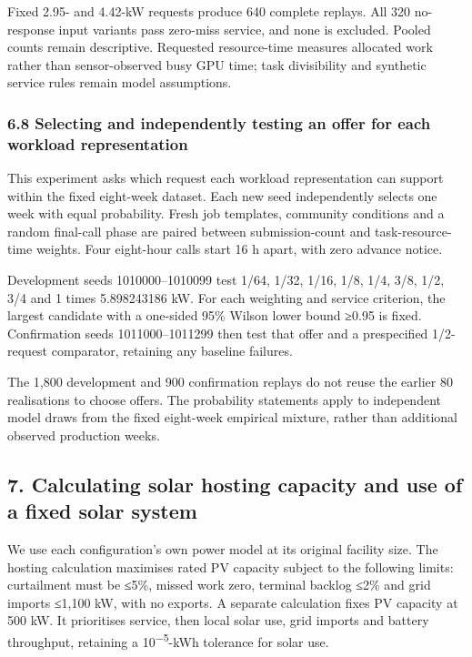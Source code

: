 \documentclass[10pt,a4paper]{article}
\begin{document}
Fixed 2.95- and 4.42-kW requests produce 640 complete replays. All 320 no-response input variants pass zero-miss service, and none is excluded. Pooled counts remain descriptive. Requested resource-time measures allocated work rather than sensor-observed busy GPU time; task divisibility and synthetic service rules remain model assumptions.


\subsubsection{6.8 Selecting and independently testing an offer for each workload representation}

This experiment asks which request each workload representation can support within the fixed eight-week dataset. Each new seed independently selects one week with equal probability. Fresh job templates, community conditions and a random final-call phase are paired between submission-count and task-resource-time weights. Four eight-hour calls start 16 h apart, with zero advance notice.


Development seeds 1010000–1010099 test 1/64, 1/32, 1/16, 1/8, 1/4, 3/8, 1/2, 3/4 and 1 times 5.898243186 kW. For each weighting and service criterion, the largest candidate with a one-sided 95\% Wilson lower bound ≥0.95 is fixed. Confirmation seeds 1011000–1011299 then test that offer and a prespecified 1/2-request comparator, retaining any baseline failures.


The 1,800 development and 900 confirmation replays do not reuse the earlier 80 realisations to choose offers. The probability statements apply to independent model draws from the fixed eight-week empirical mixture, rather than additional observed production weeks.


\subsection{7. Calculating solar hosting capacity and use of a fixed solar system}

We use each configuration's own power model at its original facility size. The hosting calculation maximises rated PV capacity subject to the following limits: curtailment must be ≤5\%, missed work zero, terminal backlog ≤2\% and grid imports ≤1,100 kW, with no exports. A separate calculation fixes PV capacity at 500 kW. It prioritises service, then local solar use, grid imports and battery throughput, retaining a 10\textsuperscript{−5}-kWh tolerance for solar use.
\end{document}
